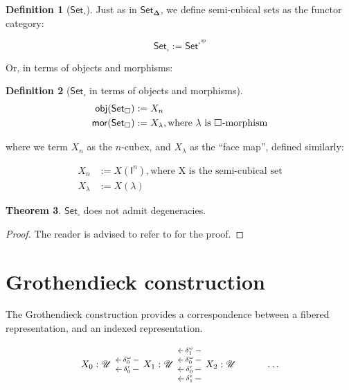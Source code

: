 \documentclass[10pt]{amsart}
\newcommand{\obj}{\ensuremath{\mathsf{obj}}}
\newcommand{\mor}{\ensuremath{\mathsf{mor}}}
\newcommand{\Set}{\ensuremath{\mathsf{Set}}}
\newcommand{\SSet}{\ensuremath{\mathsf{Set}_{\boldsymbol{\Delta}}}}
\newcommand{\Cube}[1]{\ensuremath{\boldsymbol{\square^{#1}}}}
\newcommand{\I}[1]{\ensuremath{\mathsf{I}^{#1}}}
\newcommand{\CSet}{\ensuremath{\mathsf{Set}_{\boldsymbol{\square}}}}
\newcommand{\UU}{\ensuremath{\mathscr{U}}}
\theoremstyle{definition}
\newtheorem{definition}{Definition}[section]
\newtheorem{theorem}[definition]{Theorem}
\numberwithin{definition}{subsection}
\numberwithin{definition}{section}
\begin{document}
\begin{definition}[\CSet]
  Just as in \SSet, we define semi-cubical sets as the functor category:

  \begin{equation*}
    \CSet := \Set^{\Cube{}^{op}}
  \end{equation*}
\end{definition}

Or, in terms of objects and morphisms:

\begin{definition}[$\CSet$ in terms of objects and morphisms]
  \begin{align*}
    \obj(\CSet) & := X_n                                                   \\
    \mor(\CSet) & := X_\lambda, \text{where $\lambda$ is \Cube{}-morphism}
  \end{align*}

  where we term $X_n$ as the $n$-cubex, and $X_\lambda$ as the ``face map'', defined similarly:

  \begin{align*}
    X_n       & := X(\I{n}), \text{where X is the semi-cubical set} \\
    X_\lambda & := X(\lambda)
  \end{align*}
\end{definition}

\begin{theorem}
  $\CSet$ does not admit degeneracies.
\end{theorem}

\begin{proof}
  The reader is advised to refer to \cite{Antolini00} for the proof.
\end{proof}

\section{Grothendieck construction\label{sec:grothendieckconstr}}
The Grothendieck construction provides a correspondence between a fibered representation, and an indexed representation.

$$
  \begin{tikzcd}
    X_0 : \UU & X_1 : \UU \arrow[l, "\delta^\epsilon_0" description, shift left=2] \arrow[l, "\delta^\omega_0" description, shift right=2] & X_2 : \UU \arrow[l, "\delta^\epsilon_1" description, shift left=6] \arrow[l, "\delta^\epsilon_0" description, shift left=2] \arrow[l, "\delta^\omega_0" description, shift right=2] \arrow[l, "\delta^\omega_1" description, shift right=6] & \ldots
  \end{tikzcd}
$$
\end{document}
